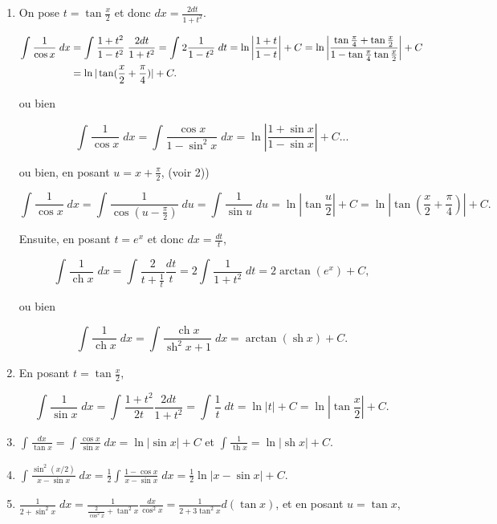 \documentclass[11pt,a4paper]{article}
\newcommand{\ch}{\mathop{\mathrm{ch}}\nolimits}
\newcommand{\sh}{\mathop{\mathrm{sh}}\nolimits}
\renewcommand{\tanh}{\mathop{\mathrm{th}}\nolimits}
\newcommand{\Arctan}{\mathop{\mathrm{arctan}}\nolimits}
\begin{document}
\begin{enumerate}

\item  On pose $t=\tan\frac{x}{2}$ et donc $dx=\frac{2dt}{1+t^2}$.

\begin{align*}\ensuremath
\int_{}^{}\frac{1}{\cos x}\;dx&=\int_{}^{}\frac{1+t^2}{1-t^2}\;\frac{2dt}{1+t^2}=\int_{}^{}2\frac{1}{1-t^2}\;dt
=\ln\left|\frac{1+t}{1-t}\right|+C=\ln\left|\frac{\tan\frac{\pi}{4}+\tan\frac{x}{2}}{1-\tan\frac{\pi}{4}\tan\frac{x}{2}}\right|+C\\
 &=\ln|\tan(\frac{x}{2}+\frac{\pi}{4})|+C.
\end{align*}

ou bien

$$\int_{}^{}\frac{1}{\cos x}\;dx=\int_{}^{}\frac{\cos x}{1-\sin^2x}\;dx=\ln\left|\frac{1+\sin x}{1-\sin x}\right|+C...$$

ou bien, en posant $u=x+\frac{\pi}{2}$, (voir 2))

$$\int_{}^{}\frac{1}{\cos x}\;dx=\int_{}^{}\frac{1}{\cos(u-\frac{\pi}{2})}\;du=\int_{}^{}\frac{1}{\sin u}\;du=
\ln|\tan\frac{u}{2}|+C=\ln|\tan(\frac{x}{2}+\frac{\pi}{4})|+C.$$

Ensuite, en posant $t=e^x$ et donc $dx=\frac{dt}{t}$,

$$\int_{}^{}\frac{1}{\ch x}\;dx
=\int_{}^{}\frac{2}{t+\frac{1}{t}}\frac{dt}{t}=2\int_{}^{}\frac{1}{1+t^2}\;dt=2\Arctan(e^x)+C,$$

ou bien

$$\int_{}^{}\frac{1}{\ch x}\;dx
=\int_{}^{}\frac{\ch x}{\sh^2x+1}\;dx=\Arctan(\sh x)+C.$$
\item  En posant $t=\tan\frac{x}{2}$,

$$\int_{}^{}\frac{1}{\sin x}\;dx=\int_{}^{}\frac{1+t^2}{2t}\frac{2dt}{1+t^2}=\int_{}^{}\frac{1}{t}\;dt=\ln|t|+C=\ln|\tan\frac{x}{2}|+C.$$

\item  $\int_{}^{}\frac{dx}{\tan x}=\int_{}^{}\frac{\cos x}{\sin x}\;dx=\ln|\sin x|+C$ et $\int_{}^{}\frac{1}{\tanh x}=\ln|\sh x|+C$.

\item  $\int_{}^{}\frac{\sin^2(x/2)}{x-\sin x}\;dx=\frac{1}{2}\int_{}^{}\frac{1-\cos x}{x-\sin x}\;dx=\frac{1}{2}\ln|x-\sin x|+C$.

\item  $\frac{1}{2+\sin^2x}\;dx=\frac{1}{\frac{2}{\cos^2x}+\tan^2x}\frac{dx}{\cos^2x}=\frac{1}{2+3\tan^2x}d(\tan x)$, et en posant $u=\tan x$,


\end{enumerate}
\end{document}
